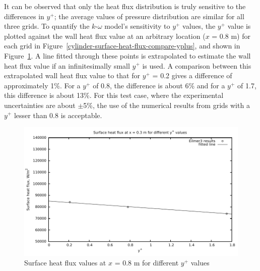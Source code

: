 It can be observed that only the heat flux distribution is truly sensitive to the 
differences in $y^+$; the average values of pressure distribution are similar for 
all three grids. To quantify the $k$-$\omega$ model's sensitivity to $y^+$ values, the 
$y^+$ value is plotted against the wall heat flux value at an arbitrary location 
($x$ = 0.8 m) for each grid in Figure~\ref{cylinder-surface-heat-flux-compare-yplus},
and shown in Figure~\ref{cylinder-compare-surface-heat-flux-for-different-yplus}. 
A line fitted through these points is extrapolated to estimate the wall heat flux value 
if an infinitesimally small $y^+$ is used. A comparison between this extrapolated 
wall heat flux value to that for $y^+$ = 0.2 gives a difference of approximately 
1\%. For a $y^+$ of 0.8, the difference is about 6\% and for a $y^+$ of 1.7, this
difference is about 13\%. For this test case, where the experimental uncertainties 
are about $\pm$5\%, the use of the numerical results from grids with  a $y^+$ 
lesser than 0.8 is acceptable.
%
\begin{figure}[h]
 \begin{center}
  \includegraphics[width=15cm]{./chap3-mallinson-cylinder/figs/yplus-sensitivity.pdf}
 \end{center}
 \caption{Surface heat flux values at $x$ = 0.8 m for different $y^+$ values}
 \label{cylinder-compare-surface-heat-flux-for-different-yplus}
\vspace{2cm}
\end{figure}

